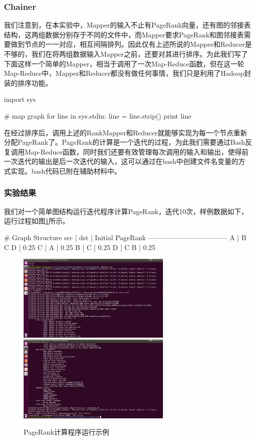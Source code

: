 \documentclass{article}
\begin{document}
\subsubsection{Chainer}
我们注意到，在本实验中，Mapper的输入不止有PageRank向量，还有图的邻接表结构，这两组数据分别存于不同的文件中，而Mapper要求PageRank和图邻接表需要做到节点的一一对应，相互间隔排列。因此仅有上述所说的Mapper和Reducer是不够的，我们在将两组数据输入Mapper之前，还要对其进行排序。为此我们写了下面这样一个简单的Mapper，相当于调用了一次Map-Reduce函数，但在这一轮Map-Reduce中，Mapper和Reducer都没有做任何事情，我们只是利用了Hadoop封装的排序功能。
\begin{python}
import sys

# map graph
for line in sys.stdin:
    line = line.strip()
    print line
\end{python}

在经过排序后，调用上述的RankMapper和Reducer就能够实现为每一个节点重新分配PageRank了。PageRank的计算是一个迭代的过程，为此我们需要通过Bash反复调用Map-Reduce函数，同时我们还要有效管理每次调用的输入和输出，使得前一次迭代的输出是后一次迭代的输入，这可以通过在bash中创建文件名变量的方式实现。bash代码已附在辅助材料中。

\subsubsection{实验结果}



我们对一个简单图结构运行迭代程序计算PageRank，迭代10次，样例数据如下，运行过程如图\ref{prrun}所示。
\begin{python}
# Graph Structure
src | dst      | Initial PageRank
-----------------------------------
 A  | B C D    | 0.25
 C  | A        | 0.25
 B  | C        | 0.25
 D  | C B      | 0.25
\end{python}

\begin{figure}[htbp]
\centering
\includegraphics[width=7.5cm]{img/running_head.png}
\includegraphics[width=7.5cm]{img/running_end.png}
\caption{PageRank计算程序运行示例}
\label{prrun}
\end{figure}
\end{document}
